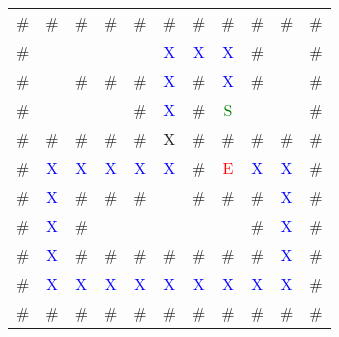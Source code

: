 {
\ttfamily
\setlength{\tabcolsep}{0.3em}
\renewcommand{\arraystretch}{0.75}
\begin{tabular}{ccccccccccc}
\# & \# & \# & \# & \# & \# & \# & \# & \# & \# & \# \\
\# &   &   &   &   & \textcolor{blue}{X} & \textcolor{blue}{X} & \textcolor{blue}{X} & \# &  & \# \\
\# &   & \# & \# & \# & \textcolor{blue}{X} & \# & \textcolor{blue}{X} & \# &   & \# \\
\# &   &   &   & \# & \textcolor{blue}{X} & \# & \textcolor{green}{S} &   &   & \# \\
\# & \# & \# & \# & \# & \textcolor{b			lue}{X} & \# & \# & \# & \# & \# \\
\# & \textcolor{blue}{X} & \textcolor{blue}{X} & \textcolor{blue}{X} & \textcolor{blue}{X} & \textcolor{blue}{X} & \# & \textcolor{red}{E} & \textcolor{blue}{X} & \textcolor{blue}{X} & \# \\
\# & \textcolor{blue}{X} & \# & \# & \# &   & \# & \# & \# & \textcolor{blue}{X} & \# \\
\# & \textcolor{blue}{X} & \# &   &   &   &   &   & \# & \textcolor{blue}{X} & \# \\
\# & \textcolor{blue}{X} & \# & \# & \# & \# & \# & \# & \# & \textcolor{blue}{X} & \# \\
\# & \textcolor{blue}{X} & \textcolor{blue}{X} & \textcolor{blue}{X} & \textcolor{blue}{X} & \textcolor{blue}{X} & \textcolor{blue}{X} & \textcolor{blue}{X} & \textcolor{blue}{X} & \textcolor{blue}{X} & \# \\
\# & \# & \# & \# & \# & \# & \# & \# & \# & \# & \#
\end{tabular}
}